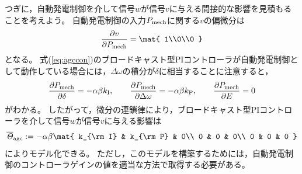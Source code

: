 \documentclass[tombow,dvipdfmx]{corona-a5-1.1}
\begin{document}
つぎに，自動発電制御を介して信号$w$が信号$v$に与える間接的な影響を見積もることを考えよう。
自動発電制御の入力$P_{\rm mech}$に関する$v$の偏微分は
\[
\frac{\partial v}{\partial P_{\rm mech}}
=
\mat{
1\\0\\0
}
\]
となる。
式(\ref{eq:agccon})のブロードキャスト型PIコントローラが自動発電制御として動作している場合には，$\Delta \omega$の積分が$\delta$に相当することに注意すると，
\[
\frac{\partial P_{\rm mech}}{\partial \delta} = -  \alpha \beta k_{\rm I}
,\qquad
\frac{\partial P_{\rm mech}}{\partial \Delta \omega}= - \alpha \beta k_{\rm P}
,\qquad
\frac{\partial P_{\rm mech}}{\partial E}= 0
\]
がわかる。
したがって，微分の連鎖律により，ブロードキャスト型PIコントローラを介して信号$w$が信号$v$に与える影響は
\begin{align}
\overline{\mathit{\Theta}}_{\rm agc}:=
-  \alpha \beta \mat{
 k_{\rm I} &  k_{\rm P} & 0\\
0 & 0 & 0\\
0 & 0 & 0
}
\end{align}
によりモデル化できる。
ただし，このモデルを構築するためには，自動発電制御のコントローラゲインの値を適当な方法で取得する必要がある。
\end{document}
